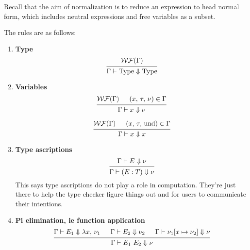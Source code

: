 \documentclass{article}
\begin{document}
Recall that the aim of normalization is to reduce an expression to head normal
form, which includes neutral expressions and free variables as a subset.

The rules are as follows:



\begin{enumerate}
\item \textbf{Type}
  \[
    \begin{prooftree}
      \hypo{\wf(\Gamma)}
      \infer1{\Gamma \vdash \Type \Downarrow \Type} 
    \end{prooftree}
  \]
\item \textbf{Variables} \\
  \[
    \begin{prooftree}
      \hypo{\wf(\Gamma)}
      \hypo{(x, \, \tau, \, \nu) \in \Gamma}
      \infer2{\Gamma \vdash x \Downarrow \nu}
    \end{prooftree} 
  \]

  \[
    \begin{prooftree}
      \hypo{\wf(\Gamma)}
      \hypo{(x, \, \tau, \, \text{und}) \in \Gamma}
      \infer2{\Gamma \vdash x \Downarrow x}
    \end{prooftree} 
  \]

\item \textbf{Type ascriptions} \\
  \[
    \begin{prooftree}
      \hypo{\Gamma \vdash E \Downarrow \nu}
      \infer1{\Gamma \vdash (E : T) \Downarrow \nu}
    \end{prooftree}
  \]
  This says type ascriptions do not play a role in computation. They're just
  there to help the type checker figure things out and for users to communicate
  their intentions.
 
\item \textbf{Pi elimination, ie function application} \\
  \[
    \begin{prooftree}
      \hypo{\Gamma \vdash E_1 \Downarrow \lambda x, \, \nu_1}
      \hypo{\Gamma \vdash E_2 \Downarrow \nu_2}
      \hypo{\Gamma \vdash \nu_1[x \mapsto \nu_2] \Downarrow \nu}
      \infer3{\Gamma \vdash E_1 \,\, E_2 \Downarrow \nu}
    \end{prooftree}
  \]


\end{enumerate}
\end{document}
